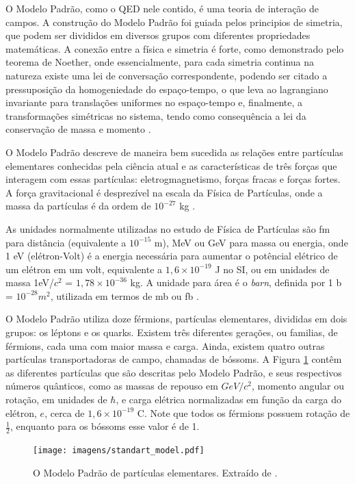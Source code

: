 O Modelo Padrão, como o QED nele contido, é uma teoria de
interação de campos. A construção do Modelo Padrão foi guiada pelos principios 
de simetria, que podem ser divididos em diversos grupos com diferentes
propriedades matemáticas. A conexão entre a física e simetria é forte, como
demonstrado pelo teorema de Noether, onde essencialmente, para cada simetria
continua na natureza existe uma lei de conversação correspondente, podendo ser
citado a pressuposição da homogeniedade do espaço-tempo, o que leva ao lagrangiano
invariante para translações uniformes no espaço-tempo e, finalmente, a
transformações simétricas no sistema, tendo como consequência a lei da conservação 
de massa e momento \cite{Intro_Standard}. 

O Modelo Padrão descreve de maneira bem sucedida as relações entre
partículas elementares conhecidas pela ciência atual 
\cite{Intro_Nuclear} e as características de
três forças que interagem com essas partículas:
eletrogmagnetismo, forças fracas e forças fortes. A força gravitacional é
desprezível na escala da Física de Partículas, onde a massa da partículas é da
ordem de $10^{-27}$ kg \cite{Intro_Standard}.

As unidades normalmente utilizadas no estudo de Física de Partículas são fm para
distância (equivalente a $10^{-15}$ m), MeV ou GeV para massa ou energia, onde 1
eV (elétron-Volt) é a energia necessária para aumentar o potêncial elétrico de
um elétron em um volt, equivalente a $1,6\times10^{-19}$ J no SI, ou em unidades
de massa 1eV/$c^2$ = $1,78\times10^{-36}$ kg. A unidade para
área é o \emph{barn}, definida por 1 b = $10^{-28} m^2$, utilizada em
termos de mb ou fb \cite{Intro_Nuclear}.

O Modelo Padrão utiliza doze férmions, partículas elementares, divididas em dois grupos: os
léptons e os quarks. Existem três diferentes gerações, ou familias, de férmions, cada uma com maior
massa e carga. Ainda, existem quatro outras partículas
transportadoras de campo, chamadas de bóssoms.
A Figura \ref{fig:modelo_padrao} contêm as diferentes partículas que são
descritas pelo Modelo Padrão, e seus respectivos números quânticos, como as massas de repouso em $GeV/c^2$, momento
angular ou rotação, em unidades de $\hbar$, e carga elétrica normalizadas em função da carga
do elétron, $e$, cerca de $1,6\times10^{-19}$ C. Note que todos os férmions
possuem rotação de $\frac{1}{2}$, enquanto para os bóssoms esse valor é de 1.

\begin{figure}[h!t]
\centering
\texttt{[image: imagens/standart\_model.pdf]}
\caption{O Modelo Padrão de partículas elementares. Extraído de
\cite{wiki_standart_model}.}
\label{fig:modelo_padrao}
\end{figure}

